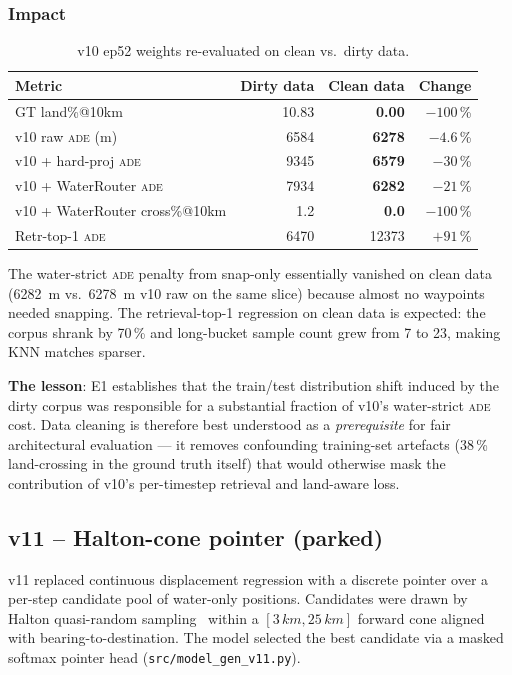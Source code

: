 \documentclass[11pt,a4paper]{article}
\newcommand{\ade}{\textsc{ade}}
\begin{document}
\subsubsection{Impact}

\begin{table}[ht]
\centering
\caption{v10 ep52 weights re-evaluated on clean vs.\ dirty data.}
\label{tab:e1}
\begin{tabular}{lrrr}
\toprule
Metric & Dirty data & Clean data & Change \\
\midrule
GT land\%@10km       & 10.83 & \textbf{0.00}  & $-100$\,\% \\
v10 raw \ade{} (m)   & 6584  & \textbf{6278}  & $-4.6$\,\% \\
v10 + hard-proj \ade{} & 9345 & \textbf{6579} & $-30$\,\% \\
v10 + WaterRouter \ade{} & 7934 & \textbf{6282} & $-21$\,\% \\
v10 + WaterRouter cross\%@10km & 1.2 & \textbf{0.0} & $-100$\,\% \\
Retr-top-1 \ade{}    & 6470  & 12373           & $+91$\,\%  \\
\bottomrule
\end{tabular}
\end{table}

The water-strict \ade{} penalty from snap-only essentially vanished on clean data
(6282~m vs.\ 6278~m v10 raw on the same slice) because almost no waypoints needed
snapping.
The retrieval-top-1 regression on clean data is expected: the corpus shrank by 70\,\%
and long-bucket sample count grew from 7 to 23, making KNN matches sparser.

\textbf{The lesson}: E1 establishes that the train/test distribution shift
induced by the dirty corpus was responsible for a substantial fraction of
v10's water-strict \ade{} cost.  Data cleaning is therefore best understood
as a \emph{prerequisite} for fair architectural evaluation --- it removes
confounding training-set artefacts (38\,\% land-crossing in the ground truth
itself) that would otherwise mask the contribution of v10's per-timestep
retrieval and land-aware loss.

\subsection{v11 -- Halton-cone pointer (parked)}
\label{sec:v11}

v11 replaced continuous displacement regression with a discrete pointer over
a per-step candidate pool of water-only positions.
Candidates were drawn by Halton quasi-random sampling~\cite{halton1960quasi}
within a $[3\,km, 25\,km]$ forward cone aligned with bearing-to-destination.
The model selected the best candidate via a masked softmax pointer head
(\texttt{src/model\_gen\_v11.py}).
\end{document}
